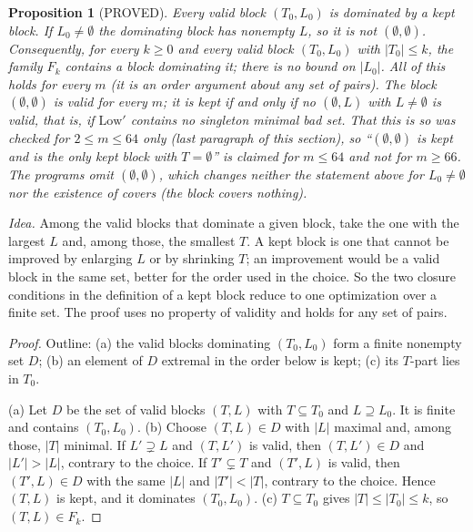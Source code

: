 \documentclass[11pt]{article}
\newtheorem{proposition}[theorem]{Proposition}
\theoremstyle{remark}
\begin{document}
\begin{proposition}[PROVED]\label{st:fam}
Every valid block $(T_0,L_0)$ is dominated by a kept block. If $L_0\ne\emptyset$ the dominating block has nonempty $L$, so it is not $(\emptyset,\emptyset)$. Consequently, for every $k\ge0$ and every valid block $(T_0,L_0)$ with $|T_0|\le k$, the family $F_k$ contains a block dominating it; there is no bound on $|L_0|$. All of this holds for every $m$ (it is an order argument about any set of pairs). The block $(\emptyset,\emptyset)$ is valid for every $m$; it is kept if and only if no $(\emptyset,L)$ with $L\ne\emptyset$ is valid, that is, if $\mathrm{Low}'$ contains no singleton minimal bad set. That this is so was checked for $2\le m\le64$ only (last paragraph of this section), so ``$(\emptyset,\emptyset)$ is kept and is the only kept block with $T=\emptyset$'' is claimed for $m\le64$ and not for $m\ge66$. The programs omit $(\emptyset,\emptyset)$, which changes neither the statement above for $L_0\ne\emptyset$ nor the existence of covers (the block covers nothing).
\end{proposition}
\noindent\emph{Idea.} Among the valid blocks that dominate a given block, take the one with the largest $L$ and, among those, the smallest $T$. A kept block is one that cannot be improved by enlarging $L$ or by shrinking $T$; an improvement would be a valid block in the same set, better for the order used in the choice. So the two closure conditions in the definition of a kept block reduce to one optimization over a finite set. The proof uses no property of validity and holds for any set of pairs.
\begin{proof}
Outline: (a) the valid blocks dominating $(T_0,L_0)$ form a finite nonempty set $D$; (b) an element of $D$ extremal in the order below is kept; (c) its $T$-part lies in $T_0$.

(a) Let $D$ be the set of valid blocks $(T,L)$ with $T\subseteq T_0$ and $L\supseteq L_0$. It is finite and contains $(T_0,L_0)$.
(b) Choose $(T,L)\in D$ with $|L|$ maximal and, among those, $|T|$ minimal. If $L'\supsetneq L$ and $(T,L')$ is valid, then $(T,L')\in D$ and $|L'|>|L|$, contrary to the choice. If $T'\subsetneq T$ and $(T',L)$ is valid, then $(T',L)\in D$ with the same $|L|$ and $|T'|<|T|$, contrary to the choice. Hence $(T,L)$ is kept, and it dominates $(T_0,L_0)$.
(c) $T\subseteq T_0$ gives $|T|\le|T_0|\le k$, so $(T,L)\in F_k$.
\end{proof}
\end{document}
